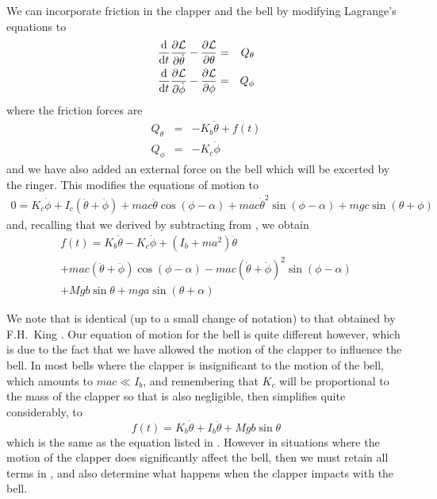 \documentclass{article}
\begin{document}
We can incorporate friction in the clapper and the bell by modifying Lagrange's equations
to
\begin{eqnarray}
\frac{\mathrm{d} }{\mathrm{d} t} \frac{\partial \cal{L}}{\partial \dot{\theta}} - \frac{\partial \cal{L}}{\partial \theta} &=& Q_\theta \\
\frac{\mathrm{d} }{\mathrm{d} t} \frac{\partial \cal{L}}{\partial \dot{\phi}} - \frac{\partial \cal{L}}{\partial \phi} &=& Q_\phi
\end{eqnarray}
where the friction forces are
\begin{eqnarray}
Q_\theta &=& -K_b \dot{\theta} + f(t)\\
Q_\phi &=& -K_c \dot{\phi}
\end{eqnarray}
and we have also added an external force on the bell which will be excerted by the ringer.
This modifies the equations of motion to
\begin{equation}
\begin{array}{c}
0 = K_c \dot{\phi} + I_c (\ddot{\theta} + \ddot{\phi})
+ mac \ddot{\theta} \cos(\phi - \alpha) 
+ mac \dot{\theta}^2 \sin(\phi - \alpha)
+ mgc \sin(\theta + \phi)
\end{array}
\label{eq:motion2friction}
\end{equation}
and, recalling that we derived  by subtracting 
 from , we obtain
\begin{equation}
\begin{array}{c}
f(t) = K_b \dot{\theta} - K_c \dot{\phi} + (I_b + ma^2) \ddot{\theta} \\
+ mac(\ddot{\theta} + \ddot{\phi}) \cos (\phi - \alpha)
-mac (\dot{\theta} + \dot{\phi})^2 \sin(\phi - \alpha) \\
+ Mgb\sin{\theta}
+ mga \sin(\theta + \alpha)
\end{array}
\label{eq:motion3friction}
\end{equation}

We note that  is identical (up to a small change of notation) to
that obtained by F.H.~King \cite{king94}. Our equation of motion for the bell 
 is quite different however, which is due to the fact that we have
allowed the motion of the clapper to influence the bell. In most bells where the clapper is
insignificant to the motion of the bell, which amounts to $mac \ll I_b$, 
and remembering that $K_c$ will be proportional to the mass of the clapper so that is also
negligible, then
 simplifies quite considerably, to
\begin{equation}
f(t) = K_b \dot{\theta} + I_b \ddot{\theta} + Mgb \sin \theta
\label{eq:bellsimplified}
\end{equation}
which is the same as the equation listed in \cite{king94}. However in situations where
the motion of the clapper does significantly affect the bell, then we must retain all
terms in , and also determine what happens when the clapper impacts
with the bell.
\end{document}
